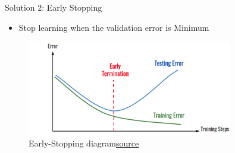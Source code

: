 \begin{frame}{Solution 2: Early Stopping}
    \begin{itemize}
        \item Stop learning when the validation error is Minimum
    \end{itemize}
    \begin{figure}
	\centering
	\includegraphics[width=0.8\textwidth]{Figs/Early Stopping.png}
	\caption{Early-Stopping diagram\href{https://medium.com/analytics-v7idhya/early-stopping-with-pytorch-to-restrain-your-model-from-overfitting-dce6de4081c5}{source}}
    \end{figure}
\end{frame}

